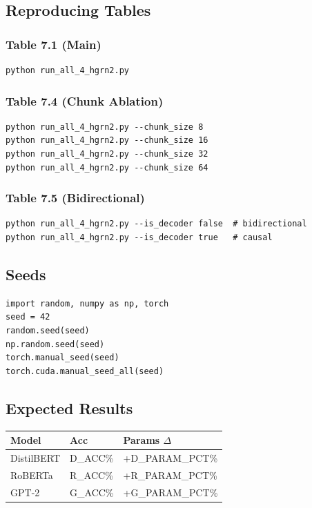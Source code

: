 \subsection{Reproducing Tables}

\subsubsection{Table 7.1 (Main)}
\begin{lstlisting}
python run_all_4_hgrn2.py
\end{lstlisting}

\subsubsection{Table 7.4 (Chunk Ablation)}
\begin{lstlisting}
python run_all_4_hgrn2.py --chunk_size 8
python run_all_4_hgrn2.py --chunk_size 16
python run_all_4_hgrn2.py --chunk_size 32
python run_all_4_hgrn2.py --chunk_size 64
\end{lstlisting}

\subsubsection{Table 7.5 (Bidirectional)}
\begin{lstlisting}
python run_all_4_hgrn2.py --is_decoder false  # bidirectional
python run_all_4_hgrn2.py --is_decoder true   # causal
\end{lstlisting}

\subsection{Seeds}

\begin{lstlisting}
import random, numpy as np, torch
seed = 42
random.seed(seed)
np.random.seed(seed)
torch.manual_seed(seed)
torch.cuda.manual_seed_all(seed)
\end{lstlisting}

\subsection{Expected Results}

\begin{table}[H]
\centering
\small
\begin{tabular}{lll}
\toprule
\textbf{Model} & \textbf{Acc} & \textbf{Params $\Delta$} \\
\midrule
DistilBERT & {{D\_ACC}}\% & +{{D\_PARAM\_PCT}}\% \\
RoBERTa & {{R\_ACC}}\% & +{{R\_PARAM\_PCT}}\% \\
GPT-2 & {{G\_ACC}}\% & +{{G\_PARAM\_PCT}}\% \\
\bottomrule
\end{tabular}
\end{table}

